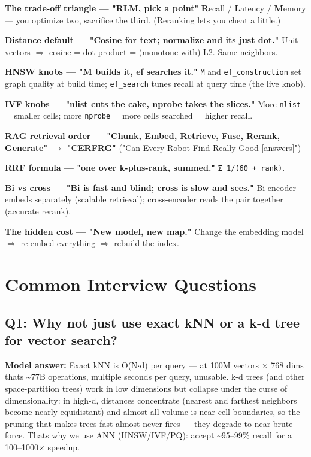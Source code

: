 \documentclass[11pt]{article}
\begin{document}
\textbf{The trade-off triangle --- "RLM, pick a point"}
\textbf{R}ecall / \textbf{L}atency / \textbf{M}emory --- you optimize two, sacrifice the third. (Reranking lets you cheat a little.)

\textbf{Distance default --- "Cosine for text; normalize and it\textquotesingle s just dot."}
Unit vectors \(\Rightarrow\) cosine = dot product = (monotone with) L2. Same neighbors.

\textbf{HNSW knobs --- "M builds it, ef searches it."}
\texttt{M} and \texttt{ef\_construction} set graph quality at build time; \texttt{ef\_search} tunes recall at query time (the live knob).

\textbf{IVF knobs --- "nlist cuts the cake, nprobe takes the slices."}
More \texttt{nlist} = smaller cells; more \texttt{nprobe} = more cells searched = higher recall.

\textbf{RAG retrieval order --- "Chunk, Embed, Retrieve, Fuse, Rerank, Generate" \(\rightarrow\) "CERFRG"}
("Can Every Robot Find Really Good {[}answers{]}")

\textbf{RRF formula --- "one over k-plus-rank, summed."} \texttt{Σ\ 1/(60\ +\ rank)}.

\textbf{Bi vs cross --- "Bi is fast and blind; cross is slow and sees."}
Bi-encoder embeds separately (scalable retrieval); cross-encoder reads the pair together (accurate rerank).

\textbf{The hidden cost --- "New model, new map."}
Change the embedding model \(\Rightarrow\) re-embed everything \(\Rightarrow\) rebuild the index.

\section{Common Interview Questions}\label{common-interview-questions}

\subsection{Q1: Why not just use exact kNN or a k-d tree for vector search?}\label{q1-why-not-just-use-exact-knn-or-a-k-d-tree-for-vector-search}

\textbf{Model answer:} Exact kNN is O(N\(\cdot\)d) per query --- at 100M vectors \(\times\) 768 dims that\textquotesingle s \textasciitilde77B operations, multiple seconds per query, unusable. k-d trees (and other space-partition trees) work in low dimensions but collapse under the curse of dimensionality: in high-d, distances concentrate (nearest and farthest neighbors become nearly equidistant) and almost all volume is near cell boundaries, so the pruning that makes trees fast almost never fires --- they degrade to near-brute-force. That\textquotesingle s why we use ANN (HNSW/IVF/PQ): accept \textasciitilde95--99\% recall for a 100--1000\(\times\) speedup.
\end{document}

